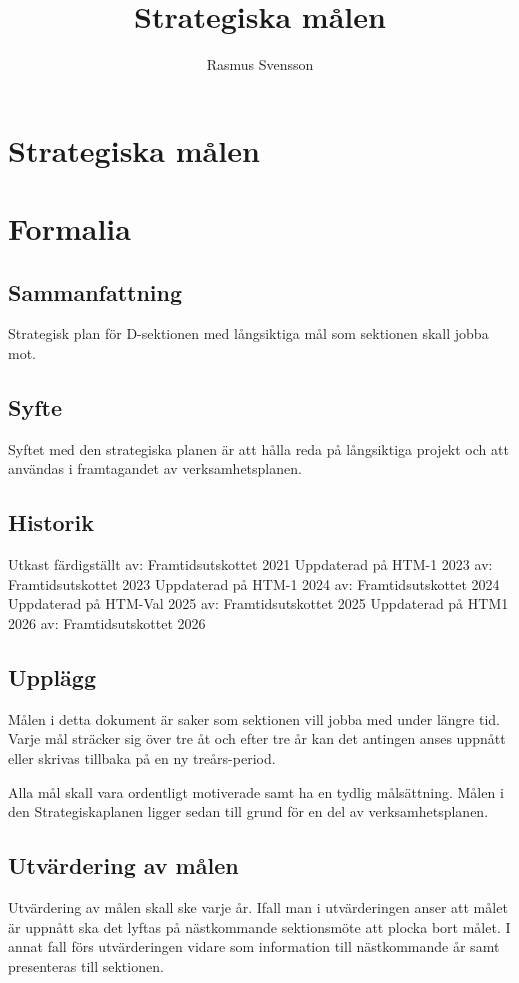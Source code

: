 \documentclass[nopdfbookmarks,a4paper, 11pt, twoside]{article}
\title{Strategiska målen}
\author{Rasmus Svensson}
\begin{document}
\section*{Strategiska målen}

\section{Formalia}
\subsection{Sammanfattning}
Strategisk plan för D-sektionen med långsiktiga mål som sektionen skall jobba mot.

\subsection{Syfte}
Syftet med den strategiska planen är att hålla reda på långsiktiga projekt och att användas i framtagandet av verksamhetsplanen.

\subsection{Historik}
Utkast färdigställt av: Framtidsutskottet 2021
Uppdaterad på HTM-1 2023 av: Framtidsutskottet 2023
Uppdaterad på HTM-1 2024 av: Framtidsutskottet 2024
Uppdaterad på HTM-Val 2025 av: Framtidsutskottet 2025
Uppdaterad på HTM1 2026 av: Framtidsutskottet 2026

\subsection{Upplägg}
Målen i detta dokument är saker som sektionen vill jobba med under längre tid. Varje mål sträcker sig över tre åt och efter tre år kan det antingen anses uppnått eller skrivas tillbaka på en ny treårs-period.

Alla mål skall vara ordentligt motiverade samt ha en tydlig målsättning. Målen i den Strategiskaplanen ligger sedan till grund för en del av verksamhetsplanen.

\subsection{Utvärdering av målen}
Utvärdering av målen skall ske varje år. Ifall man i utvärderingen anser att målet är uppnått ska det lyftas på nästkommande sektionsmöte att plocka bort målet. I annat fall förs utvärderingen vidare som information till nästkommande år samt presenteras till sektionen.
\end{document}
